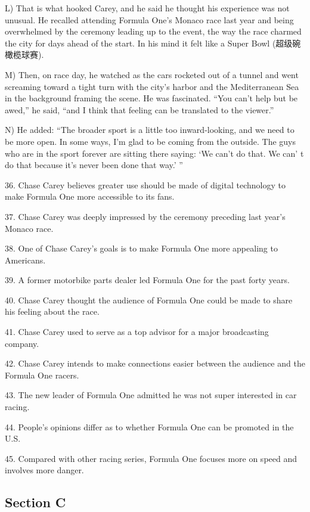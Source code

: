\documentclass[UTF8,11pt]{ctexart}
\begin{document}
L) That is what hooked Carey, and he said he thought his experience was not unusual. He recalled attending Formula One’s Monaco race last year and being overwhelmed by the ceremony leading up to the event, the way the race charmed the city for days ahead of the start. In his mind it felt like a Super Bowl (超级碗橄榄球赛).


M) Then, on race day, he watched as the cars rocketed out of a tunnel and went screaming toward a tight turn with the city’s harbor and the Mediterranean Sea in the background framing the scene. He was fascinated. “You can’t help but be awed,” he said, “and I think that feeling can be translated to the viewer.”


N) He added: “The broader sport is a little too inward-looking, and we need to be more open. In some ways, I’m glad to be coming from the outside. The guys who are in the sport forever are sitting there saying: ‘We can’t do that. We can’ t do that because it’s never been done that way.’ ”


36. Chase Carey believes greater use should be made of digital technology to make Formula One more accessible to its fans.


37. Chase Carey was deeply impressed by the ceremony preceding last year’s Monaco race.


38. One of Chase Carey’s goals is to make Formula One more appealing to Americans.


39. A former motorbike parts dealer led Formula One for the past forty years.


40. Chase Carey thought the audience of Formula One could be made to share his feeling about the race.


41. Chase Carey used to serve as a top advisor for a major broadcasting company.


42. Chase Carey intends to make connections easier between the audience and the Formula One racers.


43. The new leader of Formula One admitted he was not super interested in car racing.


44. People’s opinions differ as to whether Formula One can be promoted in the U.S.


45. Compared with other racing series, Formula One focuses more on speed and involves more danger.


\subsection*{\textbf{Section C}}
\end{document}
